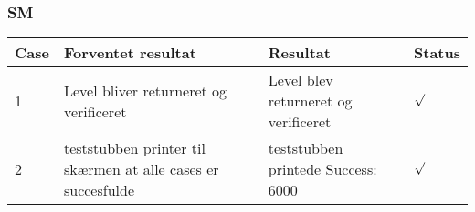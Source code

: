 \subsubsection{SM}
\begin{table}[H]
\centering
\begin{tabular}{| p{1.5cm}  | p{4cm} | p{6cm} | p{1cm} |}
\hline
Case &Forventet resultat &Resultat &Status\\\hline
1 &Level bliver returneret og verificeret &Level blev returneret og verificeret &\begin{Huge}$\surd$\end{Huge} \\\hline 
2 &teststubben printer til skærmen at alle cases er succesfulde &teststubben printede Success: 6000 &\begin{Huge}$\surd$\end{Huge} \\\hline 
\end{tabular}
\end{table}
